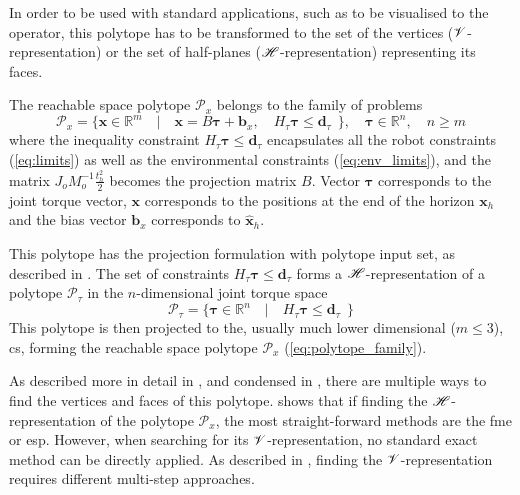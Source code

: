 In order to be used with standard applications, such as to be visualised to the operator, this polytope has to be transformed to the set of the vertices ($\mathscr{V}$-representation) or the set of half-planes ($\mathscr{H}$-representation) representing its faces.

The reachable space polytope $\mathcal{P}_x$ belongs to the family of problems
\begin{equation}
    \mathcal{P}_x = \{ \bm{x} \in \mathbb{R}^m \quad| \quad \bm{x}=B\bm{\tau} + \bm{b}_x,\quad  H_\tau\bm{\tau}\leq \bm{d}_\tau ~~\}, \quad \bm{\tau}\in \mathbb{R}^n, \quad n\geq m
\label{eq:polytope_family}
\end{equation}
where the inequality constraint $H_\tau\bm{\tau}\leq \bm{d}_\tau$ encapsulates all the robot constraints (\ref{eq:limits}) as well as the environmental constraints (\ref{eq:env_limits}), and the matrix $J_o M_o^{-1}\frac{t_h^2}{2}$ becomes the projection matrix $B$. Vector $\bm{\tau}$ corresponds to the joint torque vector, $\bm{x}$ corresponds to the positions at the end of the horizon $\bm{x}_{h}$ and the bias vector $\bm{b}_x$ corresponds to $\hat{\bm{x}}_{h}$. 

This polytope has the projection formulation with polytope input set, as described in . The set of constraints $H_\tau\bm{\tau}\leq\bm{d}_\tau$ forms a $\mathscr{H}$-representation of a polytope $\mathcal{P}_\tau$ in the $n$-dimensional joint torque space
\begin{equation}
    \mathcal{P}_\tau = \{ \bm{\tau} \in \mathbb{R}^n \quad| \quad H_\tau\bm{\tau}\leq \bm{d}_\tau ~~\}
\label{eq:polytope_torque}
\end{equation}
This polytope is then projected to the, usually much lower dimensional ($m\leq3$), \gls{cs}, forming the reachable space polytope $\mathcal{P}_x$ (\ref{eq:polytope_family}). 

As described more in detail in , and condensed in , there are multiple ways to find the vertices and faces of this polytope. 
 shows that if finding the $\mathscr{H}$-representation of the polytope $\mathcal{P}_x$, the most straight-forward methods are the \gls{fme}\cite{dantzig1973fourier} or \gls{esp}\cite{jones2004equality}. However, when searching for its $\mathscr{V}$-representation, no standard exact method can be directly applied. As described in , finding the $\mathscr{V}$-representation requires different multi-step approaches. 

